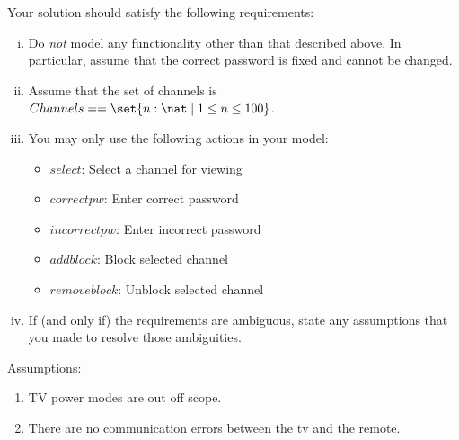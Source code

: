 \documentclass{article}
\begin{document}
\begin{enumerate}
Your solution should satisfy the following requirements:
\begin{enumerate}[i.]
\item Do \emph{not} model any functionality other than that described above. In particular, assume that the correct password is fixed and cannot be changed.
\item Assume that the set of channels is $Channels == \set{n:\nat \mid 1 \leq n \leq 100}$.
\item You may only use the following actions in your model:
    \begin{itemize}
    \item $select$: Select a channel for viewing
    \item $correctpw$: Enter correct password
    \item $incorrectpw$: Enter incorrect password
    \item $addblock$: Block selected channel
    \item $removeblock$: Unblock selected channel
    \end{itemize}
  \item If (and only if) the requirements are ambiguous, state any assumptions that you made to resolve those ambiguities. \\
\end{enumerate}
Assumptions:
\begin{enumerate}
\item TV power modes are out off scope.
\item There are no communication errors between the tv and the remote.
\end{enumerate}
\end{enumerate}
\end{document}
